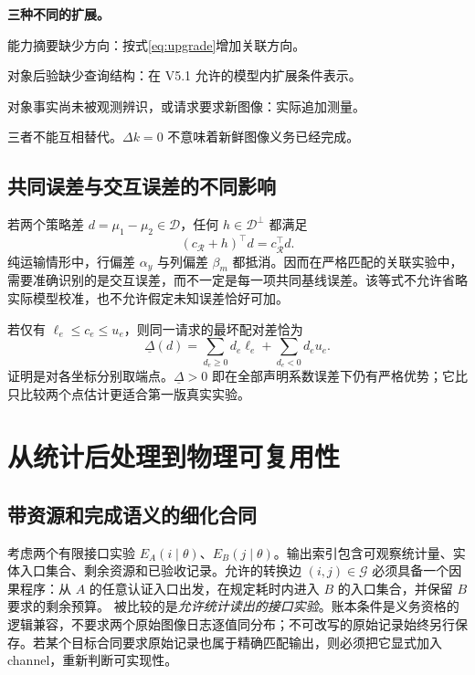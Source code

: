 \documentclass[UTF8,11pt,a4paper,fontset=fandol]{ctexart}
\numberwithin{equation}{section}
\theoremstyle{definition}
\begin{document}
\begin{keybox}
\textbf{三种不同的扩展。}\par
能力摘要缺少方向：按式\eqref{eq:upgrade}增加关联方向。\par
对象后验缺少查询结构：在 V5.1 允许的模型内扩展条件表示。\par
对象事实尚未被观测辨识，或请求要求新图像：实际追加测量。\par
三者不能互相替代。$\Delta k=0$ 不意味着新鲜图像义务已经完成。
\end{keybox}

\subsection{共同误差与交互误差的不同影响}
若两个策略差 $d=\mu_1-\mu_2\in\mathcal D$，任何 $h\in\mathcal D^\perp$ 都满足
\begin{equation}
(c_{\mathcal R}+h)^\top d=c_{\mathcal R}^\top d.
\label{eq:cancel}
\end{equation}
纯运输情形中，行偏差 $\alpha_y$ 与列偏差 $\beta_m$ 都抵消。因而在严格匹配的关联实验中，需要准确识别的是交互误差，而不一定是每一项共同基线误差。该等式不允许省略实际模型校准，也不允许假定未知误差恰好可加。

若仅有 $\ell_e\le c_e\le u_e$，则同一请求的最坏配对差恰为
\begin{equation}
\underline\Delta(d)=
\sum_{d_e\ge0}d_e\ell_e+\sum_{d_e<0}d_eu_e.
\label{eq:robustgap}
\end{equation}
证明是对各坐标分别取端点。$\underline\Delta>0$ 即在全部声明系数误差下仍有严格优势；它比只比较两个点估计更适合第一版真实实验。

\section{从统计后处理到物理可复用性}
\label{sec:refinement}

\subsection{带资源和完成语义的细化合同}
考虑两个有限接口实验 $E_A(i\mid\theta)$、$E_B(j\mid\theta)$。输出索引包含可观察统计量、实体入口集合、剩余资源和已验收记录。允许的转换边 $(i,j)\in\mathcal G$ 必须具备一个因果程序：从 $A$ 的任意认证入口出发，在规定耗时内进入 $B$ 的入口集合，并保留 $B$ 要求的剩余预算。
被比较的是\emph{允许统计读出的接口实验}。账本条件是义务资格的逻辑兼容，不要求两个原始图像日志逐值同分布；不可改写的原始记录始终另行保存。若某个目标合同要求原始记录也属于精确匹配输出，则必须把它显式加入 channel，重新判断可实现性。
\end{document}
